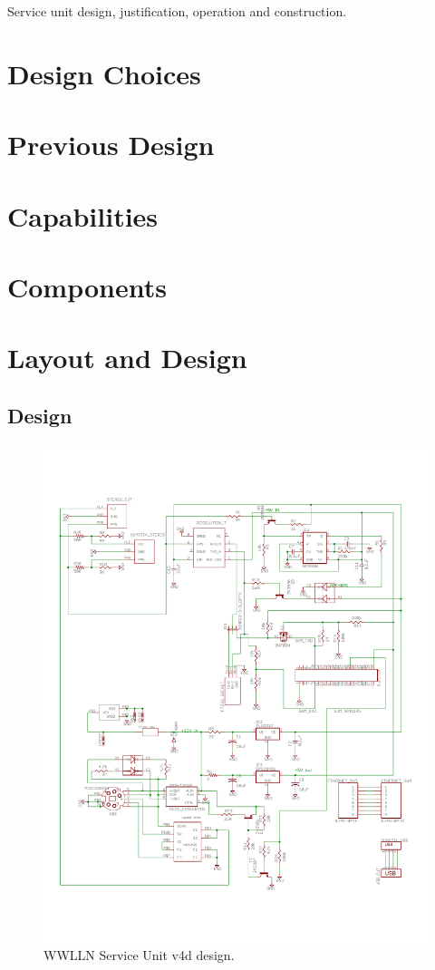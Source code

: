 Service unit design, justification, operation and construction.

\section{Design Choices}

\section{Previous Design}

\section{Capabilities}

\section{Components}

\section{Layout and Design}

\subsection{Design}

\begin{figure}[ht!]
   \centering
   \includegraphics[scale=.75]{Appendix/Figures/wwlln_SU_v4_Schematic.pdf} 
   \caption{WWLLN Service Unit v4d design.}
   \label{app:suSchematic}
\end{figure}


